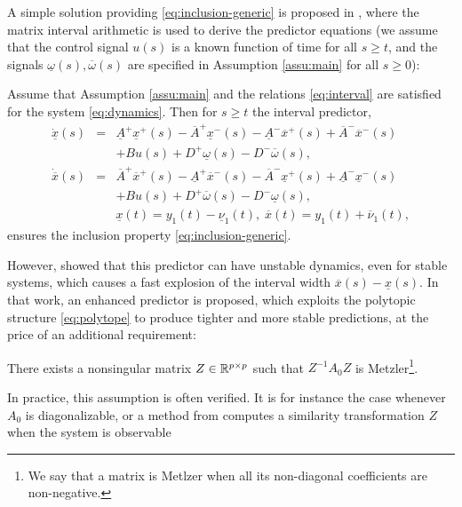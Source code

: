 \documentclass[letterpaper, 10 pt, conference]{ieeeconf}  %
\begin{document}
A simple solution providing \eqref{eq:inclusion-generic} is proposed
in \cite{Efimov2012}, where the matrix interval arithmetic is used
to derive the predictor equations (we assume that the control signal
$u(s)$ is a known function of time for all $s\geq t$, and the signals
$\underline{\omega}(s),\overline{\omega}(s)$ are specified in Assumption
\ref{assu:main} for all $s\geq0$): 
\begin{proposition}
 Assume that Assumption
\ref{assu:main} and the relations \eqref{eq:interval} are satisfied
for the system \eqref{eq:dynamics}. Then for $s\geq t$ the interval
predictor,
\begin{eqnarray}
\dot{\underline{x}}(s) & = & \underline{A}^{+}\underline{x}^{+}(s)-\overline{A}^{+}\underline{x}^{-}(s)-\underline{A}^{-}\overline{x}^{+}(s)+\overline{A}^{-}\overline{x}^{-}(s)\nonumber \\
 &  & +Bu(s)+D^{+}\underline{\omega}(s)-D^{-}\overline{\omega}(s),\label{eq:predictor-naive}\\
\dot{\overline{x}}(s) & = & \overline{A}^{+}\overline{x}^{+}(s)-\underline{A}^{+}\overline{x}^{-}(s)-\overline{A}^{-}\underline{x}^{+}(s)+\underline{A}^{-}\underline{x}^{-}(s)\nonumber \\
 &  & +Bu(s)+D^{+}\overline{\omega}(s)-D^{-}\underline{\omega}(s),\nonumber \\
 &  & \underline{x}(t)=y_{1}(t)-\underline{\nu}_{1}(t),\;\overline{x}(t)=y_{1}(t)+\overline{\nu}_{1}(t),\nonumber 
\end{eqnarray}
ensures the inclusion property \eqref{eq:inclusion-generic}.
\end{proposition}
However, \cite{leurent2019interval} showed that this predictor can
have unstable dynamics, even for stable systems, which causes a fast
explosion of the interval width $\overline{x}(s)-\underline{x}(s)$.
In that work, an enhanced predictor is proposed, which exploits the
polytopic structure \eqref{eq:polytope} to produce tighter and more
stable predictions, at the price of an additional requirement:
\begin{assumption}
\label{assu:metzler} There exists a nonsingular matrix $Z\in\mathbb{R}^{p\times p}$
such that $Z^{-1}A_{0}Z$ is Metzler\footnote{We say that a matrix is Metlzer when all its non-diagonal coefficients
are non-negative.}.
\end{assumption}
In practice, this assumption is often verified. It is for instance
the case whenever $A_{0}$ is diagonalizable, or a method from \cite{Efimov2013}
computes a similarity transformation $Z$ when the system is observable
\end{document}
